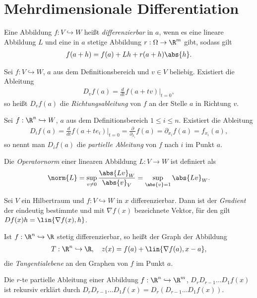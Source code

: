 \section{Mehrdimensionale Differentiation}

\begin{defn}
Eine Abbildung $f:V\hookrightarrow W$ heißt \emph{differenzierbar} in $a$, wenn
es eine lineare Abbildung $L$ und eine in $a$ stetige Abbildung $r: \Omega \to \R^m$ 
gibt, sodass gilt
\begin{align*}
f(a+h) = f(a) + Lh + r(a+h)\abs{h}.
\end{align*}
\end{defn}
\begin{defn}
Sei $f:V\hookrightarrow W$, $a$ aus dem Definitionsbereich und $v\in V$
beliebig. Existiert die Ableitung
\begin{align*}
D_vf(a) = \frac{d}{dt} f(a+tv)\big|_{t=0},
\end{align*}
so heißt $D_vf(a)$ die \emph{Richtungsableitung} von $f$ an der Stelle $a$ in
Richtung $v$.
\end{defn}
\begin{defn}
Sei $f:\R^n\hookrightarrow W$, $a$ aus dem Definitionsbereich $1\le i\le n$.
Existiert die Ableitung
\begin{align*}
D_if(a) = \frac{d}{dt} f(a+te_i)\big|_{t=0} = \frac{\partial}{\partial_{x_i}}
f(a) = \partial_{x_i}f(a) = f_{x_i}(a),
\end{align*}
so nennt man $D_if(a)$ die \emph{partielle Ableitung} von $f$ nach $i$ im Punkt
$a$.
\end{defn}
\begin{defn}
Die \emph{Operatornorm} einer linearen Abbildung $L: V\to W$ ist definiert als
\begin{align*}
\norm{L} = \sup\limits_{v\neq0} \frac{\abs{Lv}_W}{\abs{v}_V} =
\sup\limits_{\abs{v}=1} \abs{Lv}_W.
\end{align*}
\end{defn}
\begin{defn}
Sei $V$ ein Hilbertraum und $f: V\hookrightarrow W$ in $x$ differenzierbar.
Dann ist der \emph{Gradient} der eindeutig bestimmte und mit $\nabla f(x)$
bezeichnete Vektor, für den gilt $Df(x)h = \lin{\nabla f(x),h}$.
\end{defn}
\begin{defn}
Ist $f: \R^n\hookrightarrow\R$ stetig differenzierbar, so heißt der Graph der
Abbildung
\begin{align*}
T: \R^n\hookrightarrow\R,\quad z(x) = f(a)+\lin{\nabla f(a),x-a},
\end{align*} die \emph{Tangentialebene} an den Graphen von $f$ im Punkt $a$.
\end{defn}
\begin{defn}
Die $r$-te partielle Ableitung einer Abbildung $f: \R^n\hookrightarrow\R^m$,
$D_{r}D_{r-1}\ldots D_1 f(x)$ ist rekursiv erklärt durch 
$D_{r}D_{r-1}\ldots D_1 f(x) = D_{r}(D_{r-1}\ldots D_1 f(x))$.
\end{defn}

